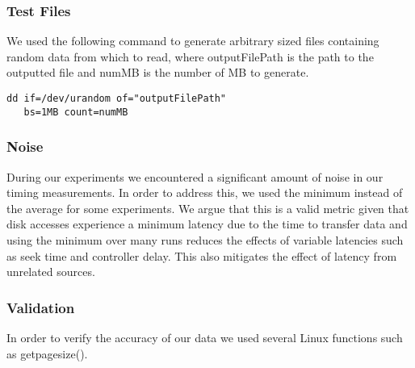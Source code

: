 \subsubsection{Test Files}
We used the following command to generate arbitrary sized files containing random
data from which to read, where outputFilePath is the path to the outputted file and numMB is the number of MB to generate.

\begin{verbatim}
dd if=/dev/urandom of="outputFilePath" 
   bs=1MB count=numMB
\end{verbatim}

\subsubsection{Noise}
During our experiments we encountered a significant amount of noise in our 
timing measurements. In order to address this, we used the minimum instead of 
the average for some experiments. We argue that this is a valid metric given 
that disk accesses experience a minimum latency due to the time to transfer data
and using the minimum over many runs reduces the effects of variable latencies 
such as seek time and controller delay. This also mitigates the effect of 
latency from unrelated sources.

\subsubsection{Validation}
In order to verify the accuracy of our data we used several Linux functions such
as getpagesize(). 

